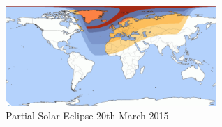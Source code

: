 \documentclass[runningheads,a4paper]{llncs}
\begin{document}
%
\begin{figure}[here]
	\centering
	\includegraphics[width=8cm]{images/41}
	\caption{Partial Solar Eclipse 20th March 2015 \citep{eclipse-15}}
	\label{fig:solar_eclipse_scale}
\end{figure}
%

%


%
\end{document}
